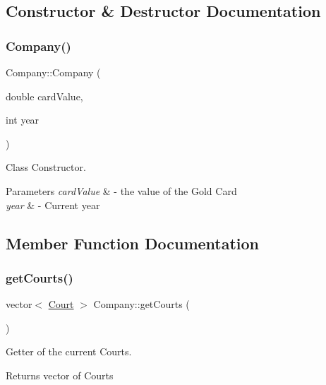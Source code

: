 \subsection{Constructor \& Destructor Documentation}
\mbox{\label{class_company_ac97cf640176971922a434b766627774f}} 
\subsubsection{\texorpdfstring{Company()}{Company()}}
{\footnotesize\ttfamily Company\+::\+Company (\begin{DoxyParamCaption}\item[{double}]{card\+Value,  }\item[{int}]{year }\end{DoxyParamCaption})}



Class Constructor. 


\begin{DoxyParams}{Parameters}
{\em card\+Value} & -\/ the value of the Gold Card \\
\hline
{\em year} & -\/ Current year \\
\hline
\end{DoxyParams}


\subsection{Member Function Documentation}
\mbox{\label{class_company_afa0ab125a0ba718fe2c13802fe1703be}} 
\subsubsection{\texorpdfstring{get\+Courts()}{getCourts()}}
{\footnotesize\ttfamily vector$<$ \mbox{\hyperlink{class_court}{Court}} $>$ Company\+::get\+Courts (\begin{DoxyParamCaption}{ }\end{DoxyParamCaption})}



Getter of the current Courts. 

\begin{DoxyReturn}{Returns}
vector of Courts 
\end{DoxyReturn}
\mbox{\label{class_company_a837fd39a8f03c20a3ceb8617410956b7}} 
